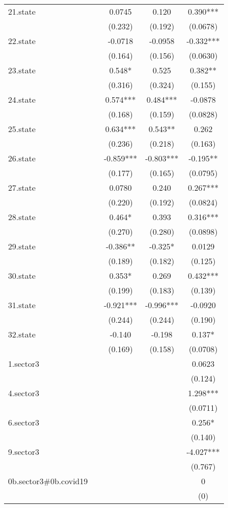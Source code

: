 \documentclass[]{article}
\begin{document}
\begin{tabular}{lcccc}
21.state &  & 0.0745 & 0.120 & 0.390*** \\
 &  & (0.232) & (0.192) & (0.0678) \\
22.state &  & -0.0718 & -0.0958 & -0.332*** \\
 &  & (0.164) & (0.156) & (0.0630) \\
23.state &  & 0.548* & 0.525 & 0.382** \\
 &  & (0.316) & (0.324) & (0.155) \\
24.state &  & 0.574*** & 0.484*** & -0.0878 \\
 &  & (0.168) & (0.159) & (0.0828) \\
25.state &  & 0.634*** & 0.543** & 0.262 \\
 &  & (0.236) & (0.218) & (0.163) \\
26.state &  & -0.859*** & -0.803*** & -0.195** \\
 &  & (0.177) & (0.165) & (0.0795) \\
27.state &  & 0.0780 & 0.240 & 0.267*** \\
 &  & (0.220) & (0.192) & (0.0824) \\
28.state &  & 0.464* & 0.393 & 0.316*** \\
 &  & (0.270) & (0.280) & (0.0898) \\
29.state &  & -0.386** & -0.325* & 0.0129 \\
 &  & (0.189) & (0.182) & (0.125) \\
30.state &  & 0.353* & 0.269 & 0.432*** \\
 &  & (0.199) & (0.183) & (0.139) \\
31.state &  & -0.921*** & -0.996*** & -0.0920 \\
 &  & (0.244) & (0.244) & (0.190) \\
32.state &  & -0.140 & -0.198 & 0.137* \\
 &  & (0.169) & (0.158) & (0.0708) \\
1.sector3 &  &  &  & 0.0623 \\
 &  &  &  & (0.124) \\
4.sector3 &  &  &  & 1.298*** \\
 &  &  &  & (0.0711) \\
6.sector3 &  &  &  & 0.256* \\
 &  &  &  & (0.140) \\
9.sector3 &  &  &  & -4.027*** \\
 &  &  &  & (0.767) \\
0b.sector3\#0b.covid19 &  &  &  & 0 \\
 &  &  &  & (0) \\

\end{tabular}
\end{document}
